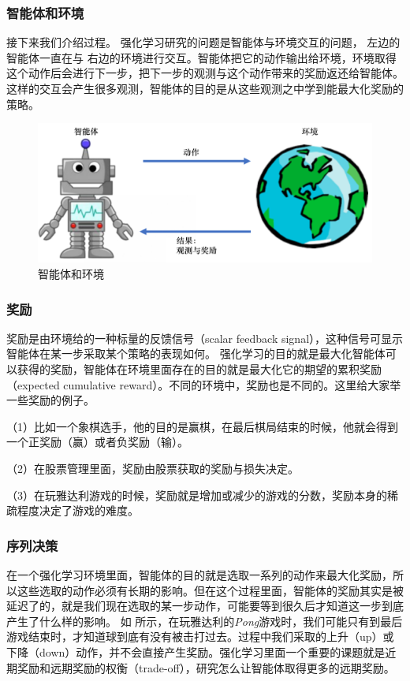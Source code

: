 \subsubsection{智能体和环境}

接下来我们介绍过程。
强化学习研究的问题是智能体与环境交互的问题， 左边的智能体一直在与 右边的环境进行交互。智能体把它的动作输出给环境，环境取得这个动作后会进行下一步，把下一步的观测与这个动作带来的奖励返还给智能体。这样的交互会产生很多观测，智能体的目的是从这些观测之中学到能最大化奖励的策略。

\begin{figure}[htb]
    \centering
    \includegraphics[width=0.5\linewidth]{res/ch1/1.18}
    \caption{智能体和环境}
    \label{fig:fig1.18}
\end{figure}

\subsubsection{奖励} 

奖励是由环境给的一种标量的反馈信号（scalar feedback signal），这种信号可显示智能体在某一步采取某个策略的表现如何。
强化学习的目的就是最大化智能体可以获得的奖励，智能体在环境里面存在的目的就是最大化它的期望的累积奖励（expected cumulative reward）。不同的环境中，奖励也是不同的。这里给大家举一些奖励的例子。

（1）比如一个象棋选手，他的目的是赢棋，在最后棋局结束的时候，他就会得到一个正奖励（赢）或者负奖励（输）。

（2）在股票管理里面，奖励由股票获取的奖励与损失决定。

（3）在玩雅达利游戏的时候，奖励就是增加或减少的游戏的分数，奖励本身的稀疏程度决定了游戏的难度。

\subsubsection{序列决策} 

在一个强化学习环境里面，智能体的目的就是选取一系列的动作来最大化奖励，所以这些选取的动作必须有长期的影响。但在这个过程里面，智能体的奖励其实是被延迟了的，就是我们现在选取的某一步动作，可能要等到很久后才知道这一步到底产生了什么样的影响。
如 所示，在玩雅达利的\textit{Pong}游戏时，我们可能只有到最后游戏结束时，才知道球到底有没有被击打过去。过程中我们采取的上升（up）或下降（down）动作，并不会直接产生奖励。强化学习里面一个重要的课题就是近期奖励和远期奖励的权衡（trade-off），研究怎么让智能体取得更多的远期奖励。

